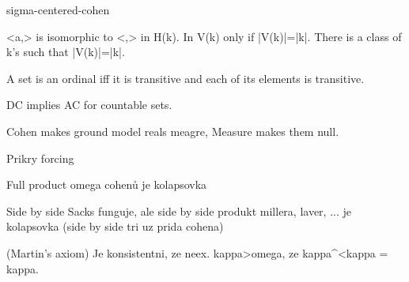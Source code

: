 \begin{exercise}{sigma-centered-cohen}
\end{exercise}

\startexercise{} <a,\leq> is isomorphic to <\alpha,\in> in H(k). In V(k) only if |V(k)|=|k|. There is a class of k's such that |V(k)|=|k|.
\stopexercise

\begin{exercise}
 A set is an ordinal iff it is transitive and each of its elements is transitive.
\end{exercise}

\begin{exercise}
 DC implies AC for countable sets.
\end{exercise}

\begin{exercise}
 Cohen makes ground model reals meagre, Measure makes them null.
\end{exercise}

\begin{exercise}
 Prikry forcing
\end{exercise}

\begin{exercise}
Full product omega cohenů je kolapsovka
\end{exercise}

\begin{exercise}
 Side by side Sacks funguje, ale side by side produkt millera, laver,  ... je kolapsovka (side by side tri uz prida cohena)
\end{exercise}

\begin{exercise} (Martin's axiom)
Je konsistentni, ze neex. kappa>omega, ze kappa^<kappa = kappa.
\end{exercise}



